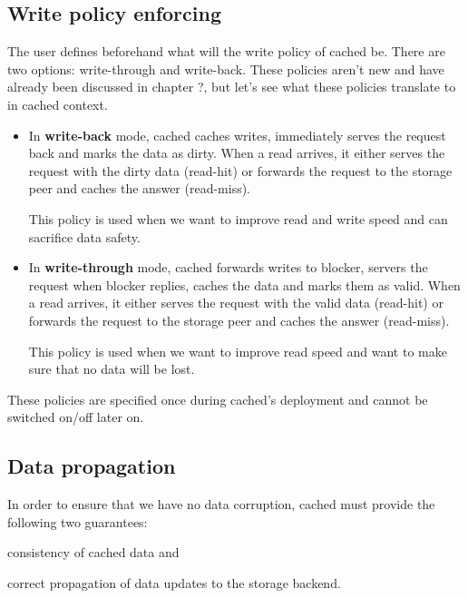 \subsection{Write policy enforcing}\label{sec:cached-wcp-design}

The user defines beforehand what will the write policy of cached be. There are 
two options: write-through and write-back. These policies aren't new and have 
already been discussed in chapter ?, but let's see what these policies 
translate to in cached context.

\begin{itemize}
	\item
		In \textbf{write-back} mode, cached caches writes, immediately 
		serves the request back and marks the data as dirty. When a read 
		arrives, it either serves the request with the dirty data 
		(read-hit) or forwards the request to the storage peer and 
		caches the answer (read-miss).

		This policy is used when we want to improve read and write speed 
		and can sacrifice data safety.
	\item
		In \textbf{write-through} mode, cached forwards writes to 
		blocker, servers the request when blocker replies, caches the 
		data and marks them as valid.  When a read arrives, it either 
		serves the request with the valid data (read-hit) or forwards 
		the request to the storage peer and caches the answer 
		(read-miss).

		This policy is used when we want to improve read speed and want 
		to make sure that no data will be lost.
\end{itemize}	

These policies are specified once during cached's deployment and cannot be 
switched on/off later on.

\subsection{Data propagation}

In order to ensure that we have no data corruption, cached must provide the 
following two guarantees:
\begin{inparaenum}[i)]
\item consistency of cached data and
\item correct propagation of data updates to the storage backend.
\end{inparaenum}

